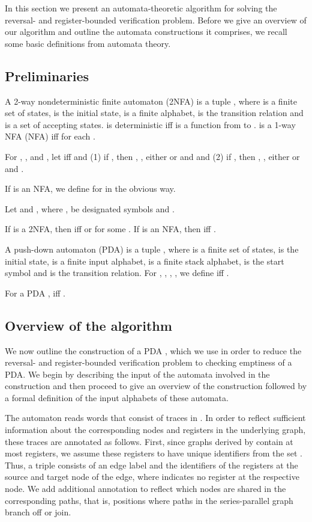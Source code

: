 In this section we present an automata-theoretic algorithm for solving the reversal- and register-bounded verification problem. Before we give an overview of our algorithm and outline the automata constructions it comprises, we recall some basic definitions from automata theory.

\subsection{Preliminaries}
 A 2-way nondeterministic finite automaton (2NFA) is a tuple
, where 
 is a finite set of states,
 is the initial state,
 is a finite alphabet,
 is the transition relation and 
 is a set of accepting states.
 is deterministic iff  is a function from  to .
 is a 1-way NFA (NFA) iff  for each . 

For , ,  and , let  iff  and
(1) if , then , , either  or  and  and 
(2) if , then , , either  or  and .
 
   
If  is an NFA, we define  for  in the obvious way.


Let  and , where , be designated symbols and .

If  is a 2NFA, then  iff
 or 
 for some .
If  is an NFA, then  iff .

A push-down automaton (PDA) is a tuple , where
 is a finite set of states,
 is the initial state,
 is a finite input alphabet,
 is a finite stack alphabet,
 is the start symbol and
 is the transition relation. For , , , ,  we define 
 iff
.

For a PDA ,  iff .


\subsection{Overview of the algorithm}
We now outline the construction of a PDA , which we use in order to reduce the reversal- and register-bounded verification problem to checking emptiness of a PDA. We begin by describing the input of the  automata involved in the construction and then proceed to give an overview of the construction followed by a  
formal definition of the input alphabets of these automata.

The automaton  reads words that consist of traces in . 
In order to reflect sufficient information about the corresponding nodes and
registers in the underlying graph, these traces are annotated as follows. 
First, since graphs derived by  contain at most  registers,
we assume these registers to have unique identifiers from the set .
Thus, a triple  
consists of an edge label  and the identifiers of the registers at the source and target node 
of the edge, where  indicates no register at the respective node.
We add additional annotation to reflect which nodes are shared in the corresponding
paths, that is, positions where paths in the series-parallel graph branch off or join. 

